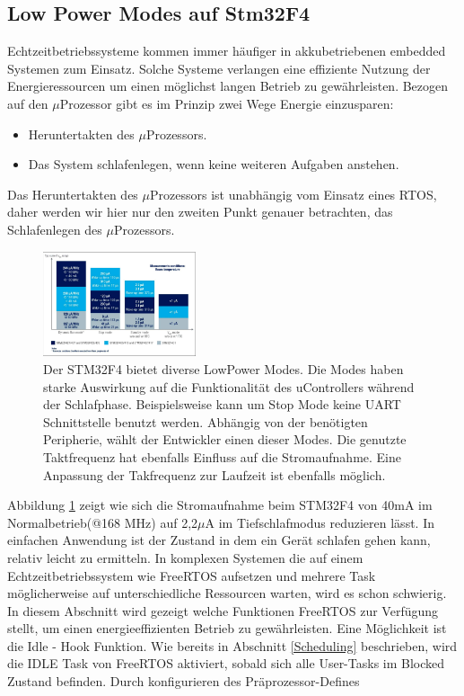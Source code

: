 \subsection{Low Power Modes auf Stm32F4}
\label{sec:Low Power Modes}
Echtzeitbetriebssysteme kommen immer häufiger in akkubetriebenen embedded Systemen zum Einsatz. Solche Systeme verlangen eine effiziente Nutzung der Energieressourcen um einen möglichst langen Betrieb zu ge\-währ\-leis\-ten. Bezogen auf den $\mu$\-Pro\-zesso\-r gibt es im Prinzip zwei Wege Energie einzusparen:
\begin{itemize}
	\item Heruntertakten des $\mu$\-Pro\-zesso\-rs.
	\item Das System schlafenlegen, wenn keine weiteren Aufgaben anstehen.
\end{itemize}
Das Heruntertakten des $\mu$\-Pro\-zesso\-rs ist unabhängig vom Einsatz eines RTOS, daher werden wir hier nur den zweiten Punkt genauer betrachten, das Schlafenlegen des $\mu$\-Pro\-zesso\-rs. 
\begin{figure}[htb!]
	\centering
		\includegraphics[width=0.4\textwidth]{Pictures/STM32F4/powerConsumption.png}
	\caption{Der STM32F4 bietet diverse LowPower Modes. Die Modes haben starke Auswirkung auf die Funktionalität des uControllers während der Schlafphase. Beispielsweise kann um Stop Mode keine UART Schnittstelle benutzt werden. Abhängig von der benötigten Peripherie, wählt der Entwickler einen dieser Modes. Die genutzte Taktfrequenz hat ebenfalls Einfluss auf die Stromaufnahme. Eine Anpassung der Takfrequenz zur Laufzeit ist ebenfalls möglich.}
	\label{fig:powerconsum}
\end{figure}
Abbildung \ref{fig:powerconsum} zeigt wie sich die Stromaufnahme beim STM32F4 von 40mA im Normalbetrieb(@168 MHz) auf 2,2$\mu$A im Tiefschlafmodus reduzieren lässt. 
In einfachen Anwendung ist der Zustand in dem ein Gerät schlafen gehen kann, relativ leicht zu ermitteln. In komplexen Systemen die auf einem Echtzeitbetriebssystem wie FreeRTOS aufsetzen und mehrere Task mög\-li\-cherweise auf unterschiedliche Ressourcen warten, wird es schon schwierig. In diesem Abschnitt wird gezeigt welche Funktionen FreeRTOS zur Ver\-fü\-gung stellt, um einen energieeffizienten Betrieb zu ge\-währ\-leis\-ten. Eine Mög\-lich\-keit ist die Idle - Hook Funktion. Wie bereits in Abschnitt \ref{Scheduling} beschrieben, wird die IDLE Task von FreeRTOS aktiviert, sobald sich alle User-Tasks im Blocked Zustand befinden. Durch konfigurieren des Präprozessor-Defines        
